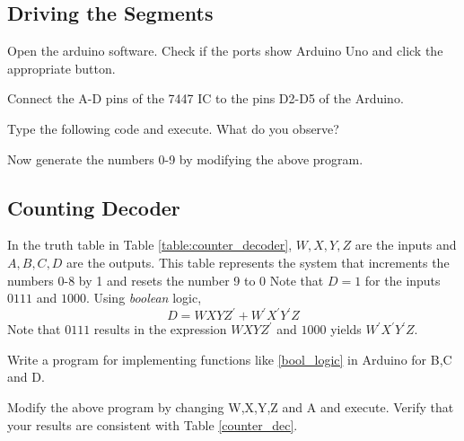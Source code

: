 \subsection{Driving the Segments}
Open the arduino software.  Check if the ports show Arduino Uno and click the appropriate button.  
\begin{problem}
Connect the A-D pins of the 7447 IC to the pins D2-D5 of the Arduino.
\end{problem}	
\begin{problem}
\label{prob:first_code}
Type the following code and execute. What do you observe?

%
\end{problem}
\begin{problem}
Now generate the numbers 0-9 by modifying the above program.
\end{problem}
%

%
\subsection{Counting Decoder}
\label{subsec:counting_decoder}
	In the  truth table in Table \ref{table:counter_decoder},  $W,X,Y,Z$ are the inputs
and $A,B,C,D$ are the outputs. This table represents the system that increments the numbers 0-8 by 1 and resets the number 9 to 0
%
Note that  $D = 1$ for the inputs $0111$ and $1000$.  Using {\em boolean} logic,
%
\begin{equation}
\label{bool_logic}
D = WXYZ^{'} + W^{'}X^{'}Y^{'}Z
\end{equation}
%
Note that $0111$ results in the expression $WXYZ^{'}$ and $1000$ yields $W^{'}X^{'}Y^{'}Z$. 
%
\begin{problem}
	\label{D_code}
Write a program for implementing functions like \eqref{bool_logic} in Arduino for B,C and D.
\end{problem}
%
\solution

%
\begin{problem}
Modify the above program by changing W,X,Y,Z and A and execute.  Verify that your results are consistent with Table \ref{counter_dec}.
\end{problem}

